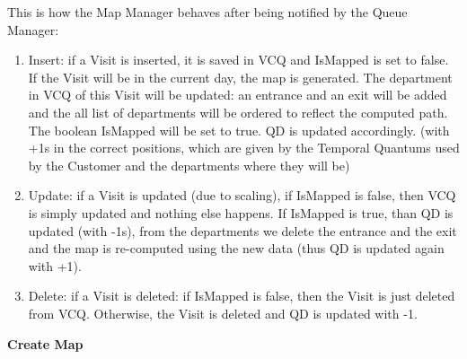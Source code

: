 \documentclass[a4paper, 12pt, oneside, table]{article}
\begin{document}
This is how the Map Manager behaves after being notified by the Queue Manager:
\begin{enumerate}
    \item Insert: if a Visit is inserted, it is saved in VCQ and IsMapped is set to false. If the Visit will be in the current day, the map is generated. The department in VCQ of this Visit will be updated: an entrance and an exit will be added and the all list of departments will be ordered to reflect the computed path. The boolean IsMapped will be set to true. QD is updated accordingly. (with +1s in the correct positions, which are given by the Temporal Quantums used by the Customer and the departments where they will be)
    \item Update: if a Visit is updated (due to scaling), if IsMapped is false, then VCQ is simply updated and nothing else happens. If IsMapped is true, than QD is updated (with -1s), from the departments we delete the entrance and the exit and the map is re-computed using the new data (thus QD is updated again with +1).
    \item Delete: if a Visit is deleted: if IsMapped is false, then the Visit is just deleted from VCQ. Otherwise, the Visit is deleted and QD is updated with -1.
\end{enumerate}

\vspace{0.4em}
\textbf{Create Map} \newline
\vspace{0.4em}
\end{document}
